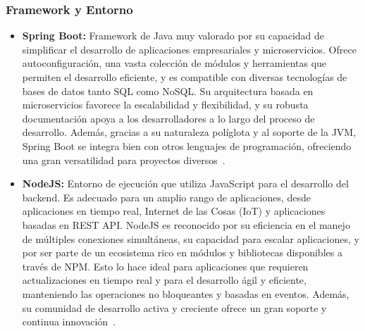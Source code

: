 \subsubsection{Framework y Entorno}
\begin{itemize}
	\item \textbf{Spring Boot:} Framework de Java muy valorado por su capacidad de simplificar el desarrollo de aplicaciones empresariales y microservicios. Ofrece autoconfiguración, una vasta colección de módulos y herramientas que permiten el desarrollo eficiente, y es compatible con diversas tecnologías de bases de datos tanto SQL como NoSQL. Su arquitectura basada en microservicios favorece la escalabilidad y flexibilidad, y su robusta documentación apoya a los desarrolladores a lo largo del proceso de desarrollo. Además, gracias a su naturaleza políglota y al soporte de la JVM, Spring Boot se integra bien con otros lenguajes de programación, ofreciendo una gran versatilidad para proyectos diversos~\cite{spring_boot_framework}.
	\item \textbf{NodeJS:} Entorno de ejecución que utiliza JavaScript para el desarrollo del backend. Es adecuado para un amplio rango de aplicaciones, desde aplicaciones en tiempo real, Internet de las Cosas (IoT) y aplicaciones basadas en REST API. NodeJS es reconocido por su eficiencia en el manejo de múltiples conexiones simultáneas, su capacidad para escalar aplicaciones, y por ser parte de un ecosistema rico en módulos y bibliotecas disponibles a través de NPM. Esto lo hace ideal para aplicaciones que requieren actualizaciones en tiempo real y para el desarrollo ágil y eficiente, manteniendo las operaciones no bloqueantes y basadas en eventos. Además, su comunidad de desarrollo activa y creciente ofrece un gran soporte y continua innovación~\cite{node_js}.
\end{itemize}
